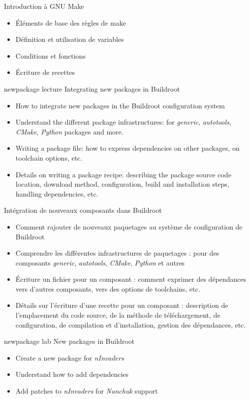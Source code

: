 {Introduction à GNU Make}
{
  \begin{itemize}
  \item Éléments de base des règles de make
  \item Définition et utilisation de variables
  \item Conditions et fonctions
  \item Écriture de recettes
  \end{itemize}
}
{newpackage}
{lecture}
{Integrating new packages in Buildroot}
{
  \begin{itemize}
  \item How to integrate new packages in the Buildroot configuration
    system
  \item Understand the different package infrastructures: for {\em
      generic}, {\em autotools}, {\em CMake}, {\em Python} packages
    and more.
  \item Writing a package  file: how to express
    dependencies on other packages, on toolchain options, etc.
  \item Details on writing a package recipe: describing the package
    source code location, download method, configuration, build and
    installation steps, handling dependencies, etc.
  \end{itemize}
}
{Intégration de nouveaux composants dans Buildroot}
{
  \begin{itemize}
  \item Comment rajouter de nouveaux paquetages au système de
	configuration de Buildroot
  \item Comprendre les différentes infrastructures de paquetages : pour
	des composants {\em generic}, {\em autotools}, {\em CMake}, {\em
	Python} et autres
  \item Écriture un fichier  pour un composant : comment
    exprimer des dépendances vers d'autres composants, vers des options
    de toolchains, etc.
  \item Détails sur l'écriture d'une recette pour un composant :
	description de l'emplacement du code source, de la méthode de
	téléchargement, de configuration, de compilation et
	d'installation, gestion des dépendances, etc. 
  \end{itemize}
}
{newpackage}
{lab}
{New packages in Buildroot}
{
  \begin{itemize}
  \item Create a new package for {\em nInvaders}
  \item Understand how to add dependencies
  \item Add patches to {\em nInvaders} for {\em Nunchuk} support
  \end{itemize}
}
